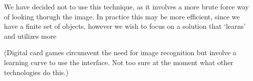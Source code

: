 \documentclass{article}
\begin{document}
We have decided not to use this technique, as it involves a more brute force way of looking thorugh the image.  In practice this may be more efficient, since we have a finite set of objects, however we wish to focus on a solution that `learns' and utilizes more 




(Digital card games circumvent the need for image recognition but involve a learning curve to use the interface. Not too sure at the moment what other technologies do this.)



\nocite{*}


\end{document}
